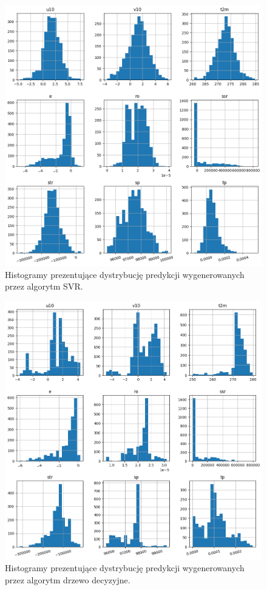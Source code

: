 \begin{figure}[H]
    \centering
    \includegraphics[width=\textwidth]{images/svr_hist.png}
    \caption[Histogramy dla SVR]{Histogramy prezentujące dystrybucję predykcji wygenerowanych przez algorytm SVR.}
    \label{svr-hist}
\end{figure}

\begin{figure}[H]
    \centering
    \includegraphics[width=\textwidth]{images/dt_hist.png}
    \caption[Histogramy dla drzewa decyzyjnego]{Histogramy prezentujące dystrybucję predykcji wygenerowanych przez algorytm drzewo decyzyjne.}
    \label{dt-hist}
\end{figure}

